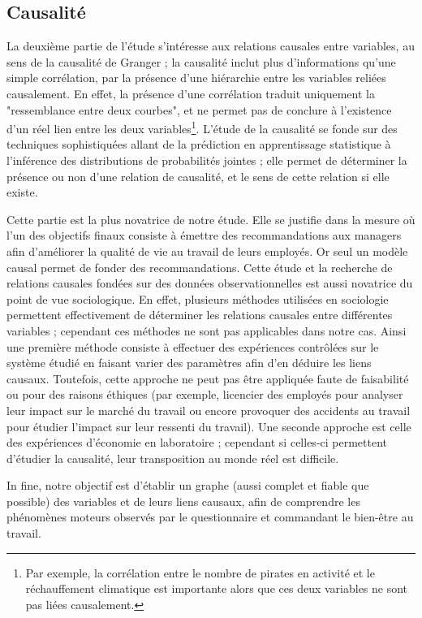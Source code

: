 \documentclass[11pt,fleqn,openany,frenchb]{book} %
\begin{document}
\subsection{Causalité}
La deuxième partie de l'étude s'intéresse aux relations causales entre variables, 
au sens de la causalité de Granger \cite{granger1969causality} ; la
causalité inclut plus d'informations qu'une simple corrélation, par la
présence d'une hiérarchie entre les variables reliées causalement. En
effet, la présence d'une corrélation traduit uniquement %
la "ressemblance
entre deux courbes", et ne permet pas de conclure à l'existence d'un
réel lien entre les deux variables\footnote{Par exemple, la
  corrélation entre le nombre de pirates en activité et le
  réchauffement climatique est importante alors que ces deux variables
  ne sont pas liées causalement.}. L'étude de la
causalité se fonde sur des techniques sophistiquées allant de la prédiction en apprentissage statistique à l'inférence des distributions de probabilités jointes ; elle permet de déterminer la présence ou
non d'une relation de causalité, et le sens de cette relation si elle existe. 

Cette partie est la plus novatrice de notre étude. Elle se justifie dans la mesure où l'un des objectifs finaux consiste à émettre des recommandations aux managers afin d'améliorer la qualité de vie au
travail de leurs employés. Or seul un modèle causal permet de fonder des recommandations. Cette étude et la recherche de relations causales fondées sur des données observationnelles est aussi novatrice du point de vue sociologique. En effet, plusieurs méthodes utilisées en sociologie permettent effectivement de déterminer les relations causales entre différentes variables ; cependant ces méthodes ne sont pas applicables dans notre cas. Ainsi une première méthode consiste à effectuer des expériences contrôlées sur le système étudié en faisant varier des paramètres afin d'en déduire les liens causaux. Toutefois, cette approche ne peut pas être appliquée faute de faisabilité ou pour des raisons éthiques (par exemple, licencier des employés pour analyser leur impact sur le marché du travail ou encore provoquer des accidents au travail pour étudier l'impact sur leur ressenti du travail). Une seconde approche est celle des expériences d'économie en laboratoire ; cependant si celles-ci permettent d'étudier la causalité, leur transposition au monde réel est difficile. 

In fine, notre objectif est d'établir un graphe (aussi complet et fiable que possible) 
des variables et de leurs liens causaux,
afin de comprendre les phénomènes moteurs observés par le questionnaire et commandant
le bien-être au travail.\par
\end{document}
